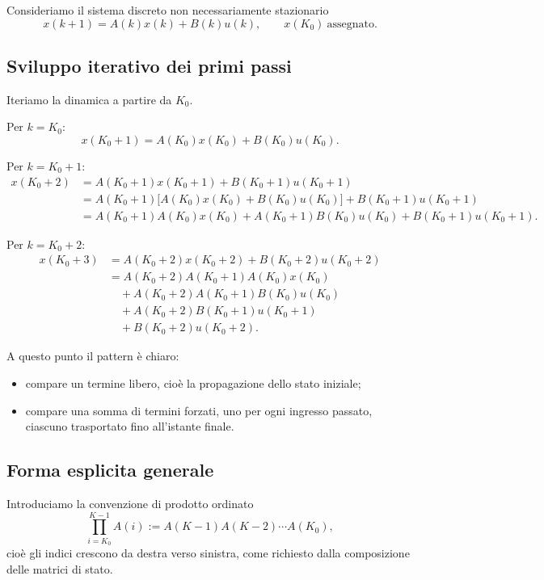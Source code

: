 Consideriamo il sistema discreto non necessariamente stazionario
\begin{equation}
x(k+1)=A(k)x(k)+B(k)u(k),
\qquad
x(K_0)\ \text{assegnato}.
\label{eq:L4_sys_TD}
\end{equation}

\subsection{Sviluppo iterativo dei primi passi}

Iteriamo la dinamica a partire da $K_0$.

Per $k=K_0$:
\[
x(K_0+1)=A(K_0)x(K_0)+B(K_0)u(K_0).
\]

Per $k=K_0+1$:
\begin{align*}
x(K_0+2)
&=A(K_0+1)x(K_0+1)+B(K_0+1)u(K_0+1)\\
&=A(K_0+1)\bigl[A(K_0)x(K_0)+B(K_0)u(K_0)\bigr]+B(K_0+1)u(K_0+1)\\
&=A(K_0+1)A(K_0)x(K_0)+A(K_0+1)B(K_0)u(K_0)+B(K_0+1)u(K_0+1).
\end{align*}

Per $k=K_0+2$:
\begin{align*}
x(K_0+3)
&=A(K_0+2)x(K_0+2)+B(K_0+2)u(K_0+2)\\
&=A(K_0+2)A(K_0+1)A(K_0)x(K_0)\\
&\quad +A(K_0+2)A(K_0+1)B(K_0)u(K_0)\\
&\quad +A(K_0+2)B(K_0+1)u(K_0+1)\\
&\quad +B(K_0+2)u(K_0+2).
\end{align*}

A questo punto il pattern è chiaro:
\begin{itemize}
    \item compare un termine libero, cioè la propagazione dello stato iniziale;
    \item compare una somma di termini forzati, uno per ogni ingresso passato, ciascuno trasportato fino all'istante finale.
\end{itemize}

\subsection{Forma esplicita generale}

Introduciamo la convenzione di prodotto ordinato
\[
\prod_{i=K_0}^{K-1}A(i):=A(K-1)A(K-2)\cdots A(K_0),
\]
cioè gli indici crescono da destra verso sinistra, come richiesto dalla composizione delle matrici di stato.

